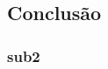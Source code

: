 \documentclass[journal]{IEEEtran}
\begin{document}
\subsection{Conclusão}
\subsubsection{sub2}


%
%



%
%
\end{document}
